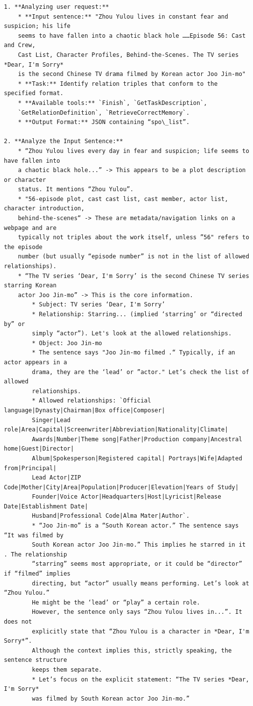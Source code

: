 \begin{verbatim}
1. **Analyzing user request:**
    * **Input sentence:** "Zhou Yulou lives in constant fear and suspicion; his life 
    seems to have fallen into a chaotic black hole ……Episode 56: Cast and Crew, 
    Cast List, Character Profiles, Behind-the-Scenes. The TV series *Dear, I'm Sorry* 
    is the second Chinese TV drama filmed by Korean actor Joo Jin-mo"
    * **Task:** Identify relation triples that conform to the specified format.
    * **Available tools:** `Finish`, `GetTaskDescription`, 
    `GetRelationDefinition`, `RetrieveCorrectMemory`. 
    * **Output Format:** JSON containing “spo\_list”.

2. **Analyze the Input Sentence:**
    * “Zhou Yulou lives every day in fear and suspicion; life seems to have fallen into 
    a chaotic black hole...” -> This appears to be a plot description or character 
    status. It mentions “Zhou Yulou”.
    * "56-episode plot, cast cast list, cast member, actor list, character introduction, 
    behind-the-scenes“ -> These are metadata/navigation links on a webpage and are 
    typically not triples about the work itself, unless ”56" refers to the episode 
    number (but usually “episode number” is not in the list of allowed relationships).
    * “The TV series ‘Dear, I'm Sorry’ is the second Chinese TV series starring Korean 
    actor Joo Jin-mo” -> This is the core information.
        * Subject: TV series ‘Dear, I'm Sorry’
        * Relationship: Starring... (implied ‘starring’ or “directed by” or 
        simply “actor”). Let's look at the allowed relationships.
        * Object: Joo Jin-mo 
        * The sentence says "Joo Jin-mo filmed .“ Typically, if an actor appears in a 
        drama, they are the ‘lead’ or ”actor." Let’s check the list of allowed 
        relationships. 
        * Allowed relationships: `Official language|Dynasty|Chairman|Box office|Composer|
        Singer|Lead role|Area|Capital|Screenwriter|Abbreviation|Nationality|Climate|
        Awards|Number|Theme song|Father|Production company|Ancestral home|Guest|Director|
        Album|Spokesperson|Registered capital| Portrays|Wife|Adapted from|Principal|
        Lead Actor|ZIP Code|Mother|City|Area|Population|Producer|Elevation|Years of Study|
        Founder|Voice Actor|Headquarters|Host|Lyricist|Release Date|Establishment Date|
        Husband|Professional Code|Alma Mater|Author`.
        * “Joo Jin-mo” is a “South Korean actor.” The sentence says “It was filmed by 
        South Korean actor Joo Jin-mo.” This implies he starred in it . The relationship 
        “starring” seems most appropriate, or it could be “director” if “filmed” implies 
        directing, but “actor” usually means performing. Let’s look at “Zhou Yulou.” 
        He might be the ‘lead’ or “play” a certain role. 
        However, the sentence only says “Zhou Yulou lives in...”. It does not 
        explicitly state that “Zhou Yulou is a character in *Dear, I'm Sorry*”. 
        Although the context implies this, strictly speaking, the sentence structure 
        keeps them separate.
        * Let’s focus on the explicit statement: “The TV series *Dear, I'm Sorry* 
        was filmed by South Korean actor Joo Jin-mo.”
        

\end{verbatim}
